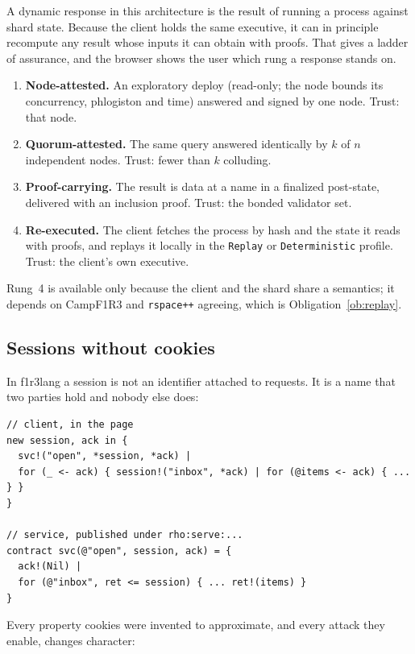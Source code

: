 \documentclass[11pt]{article}
\theoremstyle{definition}
\theoremstyle{remark}
\newcommand{\fl}{f1r3lang}
\newcommand{\Camp}{CampF1R3}
\newcommand{\code}[1]{\texttt{#1}}
\begin{document}
A dynamic response in this architecture is the result of running a process against
shard state. Because the client holds the same executive, it can in principle
recompute any result whose inputs it can obtain with proofs. That gives a ladder of
assurance, and the browser shows the user which rung a response stands on.

\begin{enumerate}[nosep]
\item \textbf{Node-attested.} An exploratory deploy (read-only; the node bounds its
  concurrency, phlogiston and time) answered and signed by one node.
  Trust: that node.
\item \textbf{Quorum-attested.} The same query answered identically by $k$ of $n$
  independent nodes. Trust: fewer than $k$ colluding.
\item \textbf{Proof-carrying.} The result is data at a name in a finalized post-state,
  delivered with an inclusion proof. Trust: the bonded validator set.
\item \textbf{Re-executed.} The client fetches the process by hash and the state it
  reads with proofs, and replays it locally in the \code{Replay} or
  \code{Deterministic} profile. Trust: the client's own executive.
\end{enumerate}

\noindent
Rung~4 is available only because the client and the shard share a semantics; it
depends on \Camp{} and \code{rspace++} agreeing, which is Obligation~\ref{ob:replay}.

\subsection{Sessions without cookies}\label{sec:sessions}

In \fl{} a session is not an identifier attached to requests. It is a name that two
parties hold and nobody else does:

\begin{lstlisting}
// client, in the page
new session, ack in {
  svc!("open", *session, *ack) |
  for (_ <- ack) { session!("inbox", *ack) | for (@items <- ack) { ... } }
}

// service, published under rho:serve:...
contract svc(@"open", session, ack) = {
  ack!(Nil) |
  for (@"inbox", ret <= session) { ... ret!(items) }
}
\end{lstlisting}

\noindent
Every property cookies were invented to approximate, and every attack they enable,
changes character:
\end{document}
